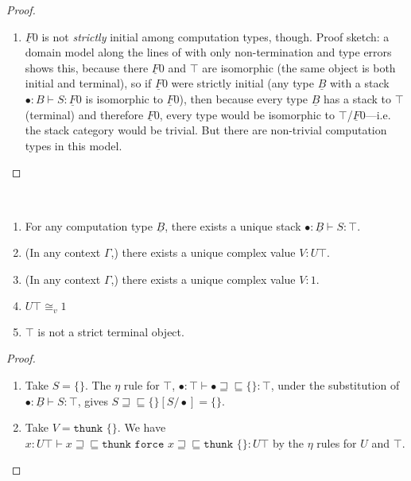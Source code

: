 \documentclass[acmsmall,nonacm]{acmart}
\renewcommand{\u}{\underline}
\newcommand{\ltdyn}{\sqsubseteq}
\newcommand{\gtdyn}{\sqsupseteq}
\newcommand{\equidyn}{\mathrel{\gtdyn\ltdyn}}
\newcommand{\bindXtoYinZ}[2]{\kw{bind}#2 \leftarrow #1;}
\newcommand{\kw}[1]{\texttt{#1}\,\,}
\newcommand{\thunk}{\kw{thunk}}
\newcommand{\force}{\kw{force}}
\newcommand{\abort}{\kw {abort}}
\begin{document}
\begin{longonly}
\begin{proof}
\begin{enumerate}
\item $\u F 0$ is not \emph{strictly} initial among computation types,
  though.  Proof sketch: a domain model along the lines of
  \citep{newlicata2018-fscd} with only non-termination and type errors shows this,
  because there $\u F 0$ and $\top$ are isomorphic (the same object is
  both initial and terminal), so if $\u F 0$ were strictly initial (any
  type $\u B$ with a stack $\bullet : B \vdash S : \u F 0$ is isomorphic
  to $\u F 0$), then because every type $\u B$ has a stack to $\top$
  (terminal) and therefore $\u F 0$, every type would be isomorphic to
  $\top$/$\u F 0$---i.e. the stack category would be trivial.  But there
  are non-trivial computation types in this model.  
    \end{enumerate}
\end{proof}
  
  \begin{lemma} ~ \label{lem:terminal}
    \begin{enumerate}
    \item For any computation type $\u B$, there exists a unique stack
      $\bullet : \u B \vdash S : \top$.
    \item (In any context $\Gamma$,) there exists a unique complex value
      $V : U \top$.
    \item (In any context $\Gamma$,) there exists a unique complex value
      $V : 1$.
    \item $U \top \cong_v 1$
    \item $\top$ is not a strict terminal object.  
    \end{enumerate}
  \end{lemma}
  \begin{proof} ~
    \begin{enumerate}
    \item Take $S = \{\}$.  The $\eta$ rule for $\top$, $\bullet : \top
      \vdash \bullet \equidyn \{\} : \top$, under the substitution of
      $\bullet : \u B \vdash S : \top$, gives $S \equidyn
      \{\}[S/\bullet] = \{\}$.  

    \item Take $V = \thunk{\{\}}$.  We have $x : U \top \vdash x
      \equidyn \thunk{\force{x}} \equidyn \thunk{\{\}} : U \top$ by the
      $\eta$ rules for $U$ and $\top$.


\end{enumerate}
\end{proof}
\end{longonly}
\end{document}
